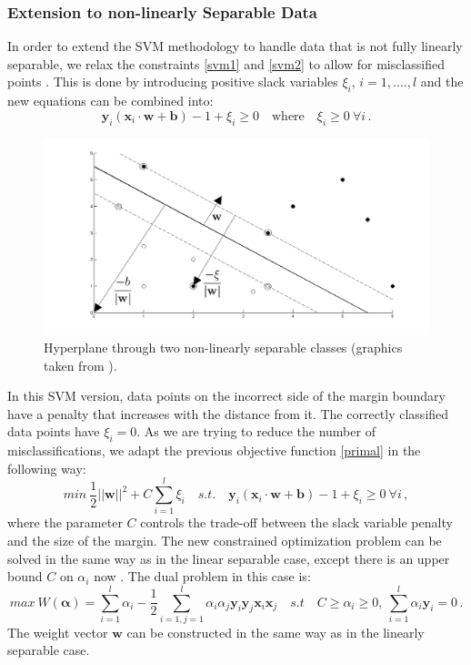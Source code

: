 \documentclass[a4paper,11pt,oneside]{article}
\begin{document}
\subsubsection*{Extension to non-linearly Separable Data}
In order to extend the SVM methodology to handle data that is not fully linearly separable, we relax 
the constraints \ref{svm1} and \ref{svm2} to allow for misclassified points \cite{fletcher2009support}. This is done by introducing
positive slack variables $\xi_i$, $i=1,....,l$ and the new equations can be combined into:
\begin{equation}
  \mathbf{y}_i(\mathbf{x}_i\cdot\mathbf{w}+\mathbf{b}) - 1 + \xi_i\geq 0 \quad \text{where} \quad \xi_i\geq 0\ \forall i\,.
\end{equation}
\begin{figure}[H]
  \includegraphics[scale=0.3]{nonlinear}
  \centering
  \caption{Hyperplane through two non-linearly separable classes (graphics taken from \cite{fletcher2009support}).}
\end{figure}
In this SVM version, data points on the incorrect side of the margin boundary have a penalty that increases with the distance
from it. The correctly classified data points have $\xi_i=0$. As we are trying to reduce the number of misclassifications,
we adapt the previous objective function \ref{primal} in the following way:
\begin{equation}
  min \ \frac{1}{2}||\mathbf{w}||^2+C\sum_{i=1}^l\xi_i\quad s.t. \quad \mathbf{y}_i(\mathbf{x}_i\cdot\mathbf{w}+\mathbf{b}) - 1 + \xi_i\geq 0 \ \forall i\,,
\end{equation}
where the parameter $C$ controls the trade-off between the slack variable penalty and the size of the margin.
The new constrained optimization problem can be solved in the same way as in the linear separable case, except
there is an upper bound $C$ on $\alpha_i$ now \cite{law2006simple}. The dual problem in this case is:
\begin{equation}
  max \ W(\mathbf{\alpha}) = \sum_{i=1}^l \alpha_i - \frac{1}{2} \sum_{i=1,j=1}^l \alpha_i \alpha_j \mathbf{y}_i\mathbf{y}_j\mathbf{x}_i\mathbf{x}_j
  \quad s.t \quad C\geq\alpha_i \geq 0,\ \sum_{i=1}^l \alpha_i\mathbf{y}_i = 0\,.
\end{equation}
The weight vector $\mathbf{w}$ can be constructed in the same way as in the linearly separable case.
\end{document}
